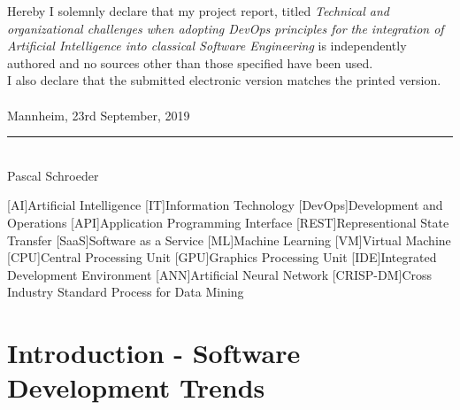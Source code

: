 \documentclass[12pt,english,a4paper,oneside,,tablecaptionabove]{scrbook}
\begin{document}




\thispagestyle{empty}

\normalsize Hereby I solemnly declare that my project report, titled \textit{Technical and organizational challenges when adopting DevOps principles
for the integration of Artificial Intelligence into classical Software
Engineering} is
independently authored and no sources other than those specified have been used.
\\I also declare that the submitted electronic version matches the printed version.\\\\

\vspace{3em}
Mannheim, 23rd September, 2019
\vspace{4em}

\rule{6cm}{0.4pt}\\
Pascal Schroeder
\newpage



\newpage
\pagestyle{plain}
\setcounter{page}{1}

{
\setcounter{tocdepth}{2}
\tableofcontents
}
	\cleardoublepage
	\listoffigures


	\cleardoublepage
	\lstlistoflistings
{}
\begin{acronym}
	[AI]{Artificial Intelligence}
	[IT]{Information Technology}
	[DevOps]{Development and Operations}
	[API]{Application Programming Interface}
	[REST]{Representional State Transfer}
	[SaaS]{Software as a Service}
	[ML]{Machine Learning}
	[VM]{Virtual Machine}
	[CPU]{Central Processing Unit}
	[GPU]{Graphics Processing Unit}
	[IDE]{Integrated Development Environment}
	[ANN]{Artificial Neural Network}
	[CRISP-DM]{Cross Industry Standard Process for Data Mining}
\end{acronym}

\newpage
\pagestyle{fancy}
\setcounter{page}{1}
\hypertarget{sec:intro}{%
\chapter{Introduction - Software Development Trends}\label{sec:intro}}
\end{document}
